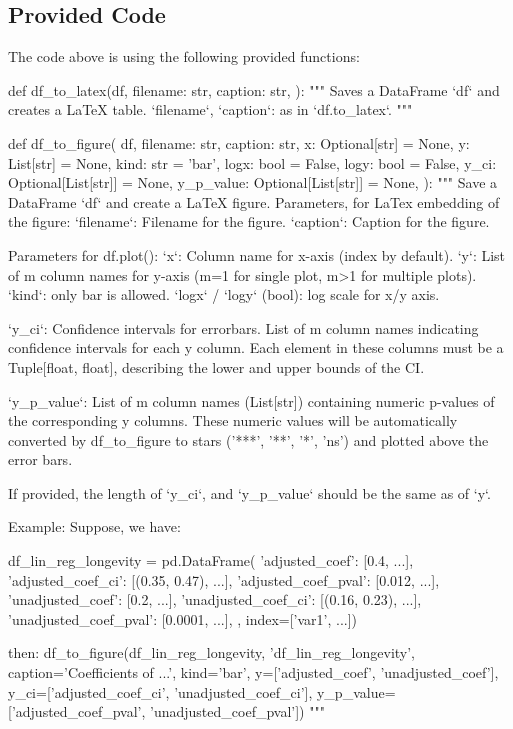 \documentclass[11pt]{article}
\begin{document}
\subsection{Provided Code}
The code above is using the following provided functions:

\begin{python}
def df_to_latex(df, 
        filename: str, caption: str,
    ):
    """
    Saves a DataFrame `df` and creates a LaTeX table.
    `filename`, `caption`: as in `df.to_latex`.
    """


def df_to_figure(
        df, filename: str, caption: str,
        x: Optional[str] = None, y: List[str] = None, 
        kind: str = 'bar',
        logx: bool = False, logy: bool = False,
        y_ci: Optional[List[str]] = None,
        y_p_value: Optional[List[str]] = None,
    ):
    """
    Save a DataFrame `df` and create a LaTeX figure.
    Parameters, for LaTex embedding of the figure:
    `filename`: Filename for the figure.
    `caption`: Caption for the figure.

    Parameters for df.plot():
    `x`: Column name for x-axis (index by default).
    `y`: List of m column names for y-axis (m=1 for single plot, m>1 for multiple plots).
    `kind`: only bar is allowed.
    `logx` / `logy` (bool): log scale for x/y axis.

    `y_ci`: Confidence intervals for errorbars. 
        List of m column names indicating confidence intervals for each y column. 
        Each element in these columns must be a Tuple[float, float], describing the lower and upper bounds of the CI. 

     `y_p_value`: List of m column names (List[str]) containing numeric p-values of the corresponding y columns. These numeric values will be automatically converted by df_to_figure to stars ('***', '**', '*', 'ns') and plotted above the error bars.

    If provided, the length of `y_ci`, and `y_p_value` should be the same as of `y`.

    Example:
    Suppose, we have:

    df_lin_reg_longevity = pd.DataFrame({
        'adjusted_coef': [0.4, ...], 'adjusted_coef_ci': [(0.35, 0.47), ...], 'adjusted_coef_pval': [0.012, ...],   
        'unadjusted_coef': [0.2, ...], 'unadjusted_coef_ci': [(0.16, 0.23), ...], 'unadjusted_coef_pval': [0.0001, ...],
    }, index=['var1', ...])

    then:
    df_to_figure(df_lin_reg_longevity, 'df_lin_reg_longevity', caption='Coefficients of ...', kind='bar',  
        y=['adjusted_coef', 'unadjusted_coef'], 
        y_ci=['adjusted_coef_ci', 'unadjusted_coef_ci'], 
        y_p_value=['adjusted_coef_pval', 'unadjusted_coef_pval'])
    """


\end{python}
\end{document}
